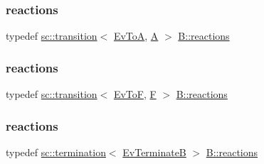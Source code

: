 \mbox{\label{struct_b_a3c296c27b9a29f5075166d4261902612}} 
\subsubsection{\texorpdfstring{reactions}{reactions}\hspace{0.1cm}{\footnotesize\ttfamily [3/6]}}
{\footnotesize\ttfamily typedef \mbox{\hyperlink{classboost_1_1statechart_1_1transition}{sc\+::transition}}$<$ \mbox{\hyperlink{struct_ev_to_a}{Ev\+ToA}}, \mbox{\hyperlink{struct_a}{A}} $>$ \mbox{\hyperlink{struct_b_a2a510c568bd4f5254e154e713bcc7724}{B\+::reactions}}}

\mbox{\label{struct_b_a0d7ad9cec2dd9d373b89c38a620756c0}} 
\subsubsection{\texorpdfstring{reactions}{reactions}\hspace{0.1cm}{\footnotesize\ttfamily [4/6]}}
{\footnotesize\ttfamily typedef \mbox{\hyperlink{classboost_1_1statechart_1_1transition}{sc\+::transition}}$<$ \mbox{\hyperlink{struct_ev_to_f}{Ev\+ToF}}, \mbox{\hyperlink{struct_f}{F}} $>$ \mbox{\hyperlink{struct_b_a2a510c568bd4f5254e154e713bcc7724}{B\+::reactions}}}

\mbox{\label{struct_b_a1ccdc4cf50c4df6bd758bb055b47dd01}} 
\subsubsection{\texorpdfstring{reactions}{reactions}\hspace{0.1cm}{\footnotesize\ttfamily [5/6]}}
{\footnotesize\ttfamily typedef \mbox{\hyperlink{classboost_1_1statechart_1_1termination}{sc\+::termination}}$<$ \mbox{\hyperlink{struct_ev_terminate_b}{Ev\+TerminateB}} $>$ \mbox{\hyperlink{struct_b_a2a510c568bd4f5254e154e713bcc7724}{B\+::reactions}}}

\mbox{\label{struct_b_a2a510c568bd4f5254e154e713bcc7724}} 
